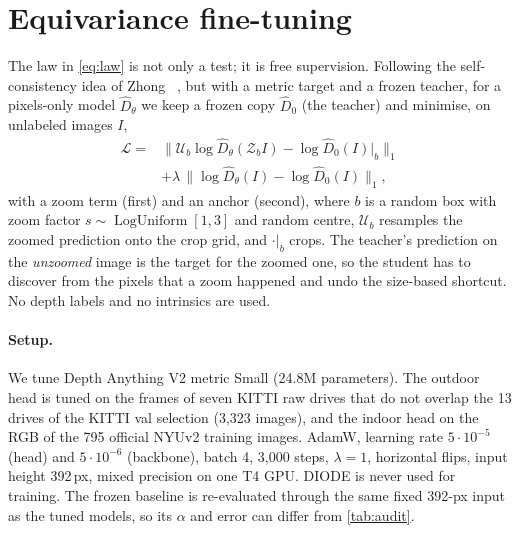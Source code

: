 \section{Equivariance fine-tuning}
\label{sec:eft}



The law in \cref{eq:law} is not only a test; it is free supervision. Following the
self-consistency idea of Zhong \etal~\cite{zhong2023equivariance}, but with a metric target and a
frozen teacher, for a pixels-only
model $\hat D_\theta$ we keep a frozen copy $\hat D_0$ (the teacher) and minimise, on
unlabeled images $I$,
\begin{equation}
\begin{aligned}
  \mathcal{L} = {} & \big\| \mathcal{U}_b \log \hat D_\theta(\mathcal{Z}_b I) - \log \hat D_0(I)\big|_b \big\|_1 \\
  & + \lambda\, \big\| \log \hat D_\theta(I) - \log \hat D_0(I)\big\|_1 ,
\end{aligned}
  \label{eq:eft}
\end{equation}
with a zoom term (first) and an anchor (second), where $b$ is a random box with zoom factor $s\sim\operatorname{LogUniform}[1,3]$ and random
centre, $\mathcal{U}_b$ resamples the zoomed prediction onto the crop grid, and
$\cdot|_b$ crops. The teacher's prediction on the \emph{unzoomed} image is the target for
the zoomed one, so the student has to discover from the pixels that a zoom happened and
undo the size-based shortcut.
No depth labels and no intrinsics are used.

\paragraph{Setup.}
We tune Depth Anything V2 metric Small (24.8M parameters). The outdoor head is tuned on the
frames of seven KITTI raw drives that do not overlap the 13 drives of the KITTI val selection (3{,}323
images), and the indoor head on the RGB of the 795 official NYUv2 training images. AdamW, learning rate $5\cdot10^{-5}$ (head) and
$5\cdot10^{-6}$ (backbone), batch 4, 3{,}000 steps, $\lambda=1$, horizontal flips, input height
392\,px, mixed precision on one T4 GPU. DIODE is never used for training. The frozen baseline is re-evaluated through the same fixed 392-px input
as the tuned models, so its $\alpha$ and error can differ from \cref{tab:audit}.

